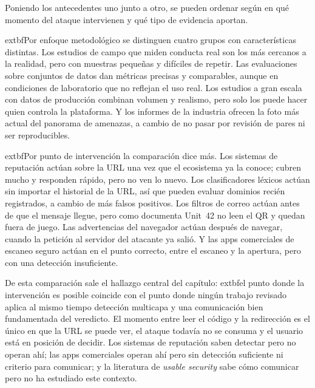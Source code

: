 Poniendo los antecedentes uno junto a otro, se pueden ordenar según en qué momento
del ataque intervienen y qué tipo de evidencia aportan.

	extbf{Por enfoque metodológico} se distinguen cuatro grupos con características
distintas. Los estudios de campo que miden conducta real \cite{vidas2013qrishing} son
los más cercanos a la realidad, pero con muestras pequeñas y difíciles de repetir. Las
evaluaciones sobre conjuntos de datos
\cite{sheng2009empirical,ma2009beyond,le2011phishdef} dan métricas precisas y
comparables, aunque en condiciones de laboratorio que no reflejan el uso real. Los
estudios a gran escala con datos de producción \cite{akhawe2013alice} combinan volumen y
realismo, pero solo los puede hacer quien controla la plataforma. Y los informes de la
industria \cite{insikt2024qrcode,unit42_2023qr} ofrecen la foto más actual del panorama
de amenazas, a cambio de no pasar por revisión de pares ni ser reproducibles.

	extbf{Por punto de intervención} la comparación dice más. Los sistemas de reputación
\cite{google_safebrowsing,virustotal_apiv3,phishtank_devinfo,urlhaus_api} actúan sobre la
URL una vez que el ecosistema ya la conoce; cubren mucho y responden rápido, pero no ven
lo nuevo. Los clasificadores léxicos \cite{ma2009beyond,le2011phishdef} actúan sin
importar el historial de la URL, así que pueden evaluar dominios recién registrados, a
cambio de más falsos positivos. Los filtros de correo actúan antes de que el mensaje
llegue, pero como documenta Unit~42 \cite{unit42_2023qr} no leen el QR y quedan fuera de
juego. Las advertencias del navegador \cite{egelman2008warned,akhawe2013alice} actúan
después de navegar, cuando la petición al servidor del atacante ya salió. Y las apps
comerciales de escaneo seguro actúan en el punto correcto, entre el escaneo y la
apertura, pero con una detección insuficiente.

De esta comparación sale el hallazgo central del capítulo: 	extbf{el punto donde la
intervención es posible coincide con el punto donde ningún trabajo revisado aplica al
mismo tiempo detección multicapa y una comunicación bien fundamentada del veredicto.} El
momento entre leer el código y la redirección es el único en que la URL se puede ver, el
ataque todavía no se consuma y el usuario está en posición de decidir. Los sistemas de
reputación saben detectar pero no operan ahí; las apps comerciales operan ahí pero sin
detección suficiente ni criterio para comunicar; y la literatura de \emph{usable
security} sabe cómo comunicar pero no ha estudiado este contexto.

